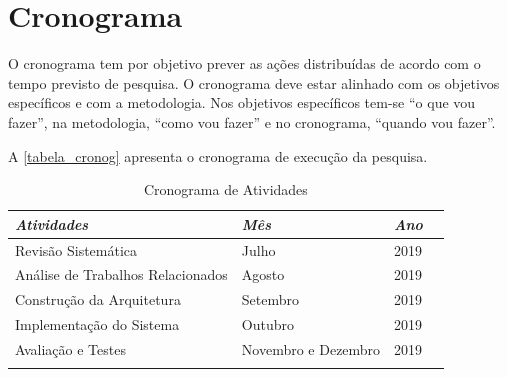 \documentclass[
	12pt,				%
	openright,			%
	oneside,
	a4paper,			%
	english,			%
	french,				%
	spanish,			%
	brazil,				%
	]{abntex2}
\begin{document}


\chapter{Cronograma}

O cronograma tem por objetivo prever as ações distribuídas de acordo com o tempo previsto de pesquisa. O cronograma deve estar alinhado com os objetivos específicos e com a metodologia. Nos objetivos específicos tem-se “o que vou fazer”, na metodologia, “como vou fazer” e no cronograma, “quando vou fazer”.

A  \autoref{tabela_cronog} apresenta o cronograma de execução da pesquisa. 

\begin{table}[!htb]
\centering
\caption{Cronograma de Atividades}
\label{tabela_cronog}
\begin{tabular}{@{}llll@{}}
\toprule
\textit{Atividades}                  & \textit{Mês}       & \textit{Ano}   \\ \midrule
Revisão Sistemática                  & Julho              & 2019      \\
Análise de Trabalhos Relacionados    & Agosto             & 2019      \\
Construção da Arquitetura            & Setembro           & 2019      \\
Implementação do Sistema             & Outubro            & 2019      \\
Avaliação e Testes                    & Novembro e Dezembro& 2019      \\
                                     &                    &           \\ \bottomrule
\end{tabular}
\end{table}










\postextual
\end{document}
